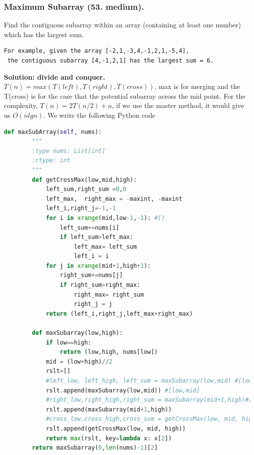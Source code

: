 \documentclass[../main.tex]{subfiles}
\begin{document}
\subsubsection{Maximum Subarray (53. medium).}
Find the contiguous subarray within an array (containing at least one number) which has the largest sum.
\begin{lstlisting}[numbers=none]
For example, given the array [-2,1,-3,4,-1,2,1,-5,4],
 the contiguous subarray [4,-1,2,1] has the largest sum = 6.
\end{lstlisting}
\textbf{Solution: divide and conquer.} $T(n) = max(T(left),T(right), T(cross))$, max is for merging and the T(cross) is for the case that the potential subarray across the mid point. For the complexity, $T(n)=2T(n/2)+n$, if we use the master method, it would give us $O(nlgn)$. We write the following Python code
\begin{lstlisting}[language = Python]
def maxSubArray(self, nums):
        """
        :type nums: List[int]
        :rtype: int
        """
        def getCrossMax(low,mid,high):
            left_sum,right_sum =0,0
            left_max,  right_max = -maxint, -maxint
            left_i,right_j=-1,-1
            for i in xrange(mid,low-1,-1): #[)
                left_sum+=nums[i]
                if left_sum>left_max:
                    left_max= left_sum
                    left_i = i
            for j in xrange(mid+1,high+1):
                right_sum+=nums[j]
                if right_sum>right_max:
                    right_max= right_sum
                    right_j = j
            return (left_i,right_j,left_max+right_max)
        
        def maxSubarray(low,high):
            if low==high:
                return (low,high, nums[low])
            mid = (low+high)//2
            rslt=[]
            #left_low, left_high, left_sum = maxSubarray(low,mid) #[low,mid]
            rslt.append(maxSubarray(low,mid)) #[low,mid]
            #right_low,right_high,right_sum = maxSubarray(mid+1,high)#[mid+1,high]
            rslt.append(maxSubarray(mid+1,high))
            #cross_low,cross_high,cross_sum = getCrossMax(low, mid, high)
            rslt.append(getCrossMax(low, mid, high))
            return max(rslt, key=lambda x: x[2])
        return maxSubarray(0,len(nums)-1)[2]
\end{lstlisting}





\end{document}
